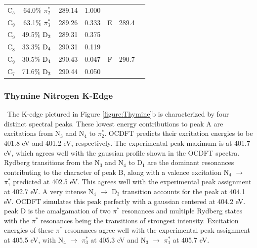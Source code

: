 \documentclass[12pt]{article}
\begin{document}
\begin{table}[!t]
\begin{tabular*}{8.5cm}{@{\extracolsep{\fill} }cccrccc}
    C$_5$
 &   64.0$\%$ $\pi_2^*$  & 289.14 & 1.000 & \multirow{3}{*}{E} & \multirow{3}{*}{289.4} \\
    C$_9$
 &   63.1$\%$ $\pi_3^*$  & 289.26 & 0.333 \\
    C$_9$
 &   49.5$\%$ $\rm D_2$  & 289.31 & 0.375 
 \vspace{0.05in}\\
    C$_8$
 &   33.3$\%$ $\rm D_4$  & 290.31 & 0.119 & \multirow{3}{*}{F} &  \multirow{3}{*}{290.7}  \\
    C$_9$
 &   30.5$\%$ $\rm D_4$  & 290.43 & 0.047 \\
    C$_7$
 &   71.6$\%$ $\rm D_3$  & 290.44 & 0.050 \\
\hline\hline%
   \end{tabular*}
   \label{table: thymine_k_oxygen}
   \end{table}
\subsubsection{Thymine Nitrogen K-Edge} \ The K-edge pictured in Figure \ref{figure:Thymine}b is characterized by four distinct spectral peaks. These lowest energy contributions to peak A are excitations from N$_3$ and N$_4$ to $\pi^*_2$. OCDFT predicts their excitation energies to be 401.8 eV and 401.2 eV, respectively. The experimental peak maximum is at 401.7 eV, which agrees well with the gaussian profile shown in the OCDFT spectra. Rydberg transitions from the N$_3$ and N$_4$ to D$_1$ are the dominant resonances contributing to the character of peak B, along with a valence excitation N$_4$ $\rightarrow$ $\pi^*_1$ predicted at 402.5 eV. This agrees well with the experimental peak assignment at 402.7 eV. A very intense N$_4$ $\rightarrow$ D$_3$ transition accounts for the peak at 404.1 eV. OCDFT simulates this peak perfectly with a gaussian centered at 404.2 eV. peak D is the amalgamation of two $\pi^*$ resonances and multiple Rydberg states with the $\pi^*$ resonances being the transitions of strongest intensity. Excitation energies of these $\pi^*$ resonances agree well with the experimental peak assignment at 405.5 eV, with N$_4$ $\rightarrow$ $\pi^*_3$ at 405.3 eV and N$_3$ $\rightarrow$ $\pi^*_1$ at 405.7 eV.
\end{document}
